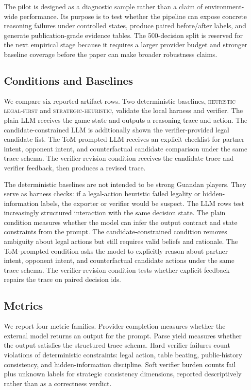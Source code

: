 \documentclass[sigconf,anonymous,review]{acmart}
\begin{document}
The pilot is designed as a diagnostic sample rather than a claim of environment-wide performance. Its purpose is to test whether the pipeline can expose concrete reasoning failures under controlled states, produce paired before/after labels, and generate publication-grade evidence tables. The 500-decision split is reserved for the next empirical stage because it requires a larger provider budget and stronger baseline coverage before the paper can make broader robustness claims.

\subsection{Conditions and Baselines}

We compare six reported artifact rows. Two deterministic baselines, \textsc{heuristic-legal-first} and \textsc{strategic-heuristic}, validate the local harness and verifier. The plain LLM receives the game state and outputs a reasoning trace and action. The candidate-constrained LLM is additionally shown the verifier-provided legal candidate list. The ToM-prompted LLM receives an explicit checklist for partner intent, opponent intent, and counterfactual candidate comparison under the same trace schema. The verifier-revision condition receives the candidate trace and verifier feedback, then produces a revised trace.

The deterministic baselines are not intended to be strong Guandan players. They serve as harness checks: if a legal-action heuristic failed legality or hidden-information labels, the exporter or verifier would be suspect. The LLM rows test increasingly structured interaction with the same decision state. The plain condition measures whether the model can infer the output contract and state constraints from the prompt. The candidate-constrained condition removes ambiguity about legal actions but still requires valid beliefs and rationale. The ToM-prompted condition asks the model to explicitly reason about partner intent, opponent intent, and counterfactual candidate actions under the same trace schema. The verifier-revision condition tests whether explicit feedback repairs the trace on paired decision ids.

\subsection{Metrics}

We report four metric families. Provider completion measures whether the external model returns an output for the prompt. Parse yield measures whether the output satisfies the structured trace schema. Hard verifier failures count violations of deterministic constraints: legal action, table beating, public-history consistency, and hidden-information discipline. Soft verifier burden counts fail plus unknown labels for strategic consistency dimensions, reported descriptively rather than as a correctness verdict.
\end{document}
